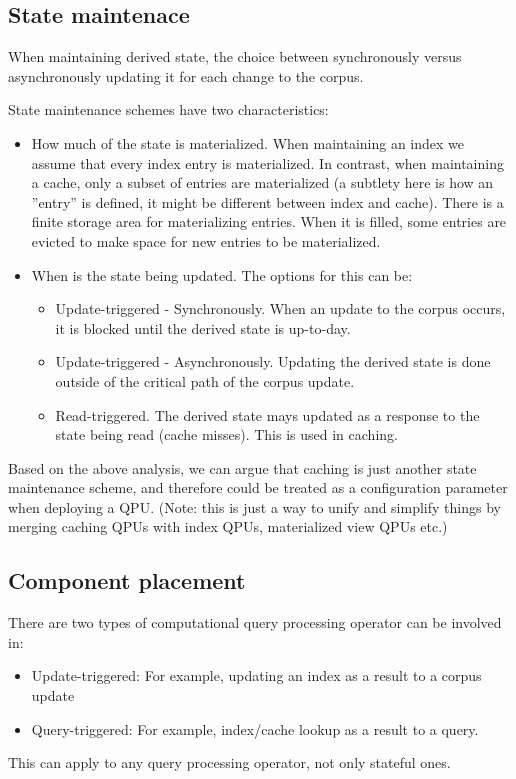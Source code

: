 \subsection{State maintenace}
When maintaining derived state, the choice between synchronously versus
asynchronously updating it for each change to the corpus.

State maintenance schemes have two characteristics:
\begin{itemize}
  \item How much of the state is materialized.
  When maintaining an index we assume that every index entry is materialized.
  In contrast, when maintaining a cache, only a subset of entries are
  materialized
  (a subtlety here is how an ''entry'' is defined, it might be different between
  index and cache).
  There is a finite storage area for materializing entries.
  When it is filled, some entries are evicted to make space for new entries to
  be materialized.
  \item When is the state being updated.
  The options for this can be:
  \begin{itemize}
    \item Update-triggered - Synchronously. When an update to the corpus
    occurs, it is blocked until the derived state is up-to-day.
    \item Update-triggered - Asynchronously. Updating the derived state is done
    outside of the critical path of the corpus update.
    \item Read-triggered. The derived state mays updated as a response to the
    state being read (cache misses).
    This is used in caching.
  \end{itemize}
\end{itemize}
  Based on the above analysis, we can argue that caching is just another state
  maintenance scheme, and therefore could be treated as a configuration
  parameter when deploying a QPU.
  (Note: this is just a way to unify and simplify things by merging caching
  QPUs with index QPUs, materialized view QPUs etc.)

\subsection{Component placement}
There are two types of computational query processing operator can be
involved in:
\begin{itemize}
  \item Update-triggered: For example, updating an index as a result to a corpus
  update
  \item Query-triggered: For example, index/cache lookup as a result to a query.
\end{itemize}
This can apply to any query processing operator, not only stateful ones.

